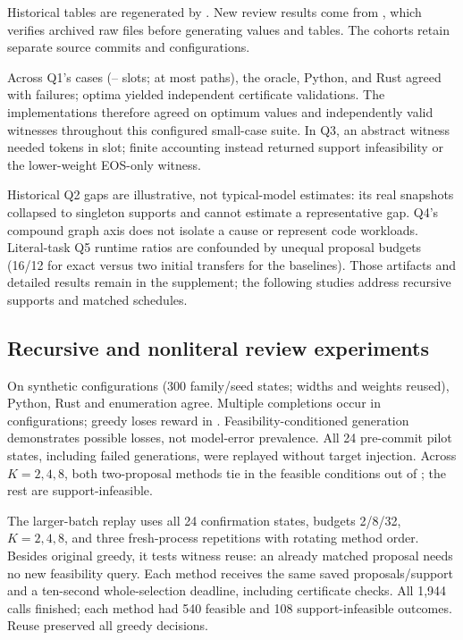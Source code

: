 Historical tables are regenerated by . New review results come from , which verifies archived raw files before generating values and tables. The cohorts retain separate source commits and configurations.

Across Q1's \MThirteenQOneCases{} cases (\MThirteenQOneMinSlots--\MThirteenQOneMaxSlots{} slots; at most \MThirteenQOneMaxPaths{} paths), the oracle, Python, and Rust agreed with \MThirteenQOneFailures{} failures; \MThirteenQOneOptimalCases{} optima yielded \MThirteenQOneCertificateChecks{} independent certificate validations. The implementations therefore agreed on optimum values and independently valid witnesses throughout this configured small-case suite. In Q3, an abstract witness needed \MThirteenQThreeRequiredTokens{} tokens in \MThirteenQThreeAvailableSlots{} slot; finite accounting instead returned support infeasibility or the lower-weight EOS-only witness.

Historical Q2 gaps are illustrative, not typical-model estimates: its real snapshots collapsed to singleton supports and cannot estimate a representative gap. Q4's compound graph axis does not isolate a cause or represent code workloads. Literal-task Q5 runtime ratios are confounded by unequal proposal budgets (16/12 for exact versus two initial transfers for the baselines). Those artifacts and detailed results remain in the supplement; the following studies address recursive supports and matched schedules.

\subsection{Recursive and nonliteral review experiments}

On \MReviewBranchingCases{} synthetic configurations (300 family/seed states; widths and weights reused), Python, Rust and enumeration agree. Multiple completions occur in \MReviewBranchingMultiple{} configurations; greedy loses reward in \MReviewBranchingGaps{}. Feasibility-conditioned generation demonstrates possible losses, not model-error prevalence. All 24 pre-commit pilot states, including failed generations, were replayed without target injection. Across $K=2,4,8$, both two-proposal methods tie in the \MReviewReplayFeasible{} feasible conditions out of \MReviewReplayPairs{}; the rest are support-infeasible.

The larger-batch replay uses all 24 confirmation states, budgets 2/8/32, $K=2,4,8$, and three fresh-process repetitions with rotating method order. Besides original greedy, it tests witness reuse: an already matched proposal needs no new feasibility query. Each method receives the same saved proposals/support and a ten-second whole-selection deadline, including certificate checks. All 1,944 calls finished; each method had 540 feasible and 108 support-infeasible outcomes. Reuse preserved all greedy decisions.

